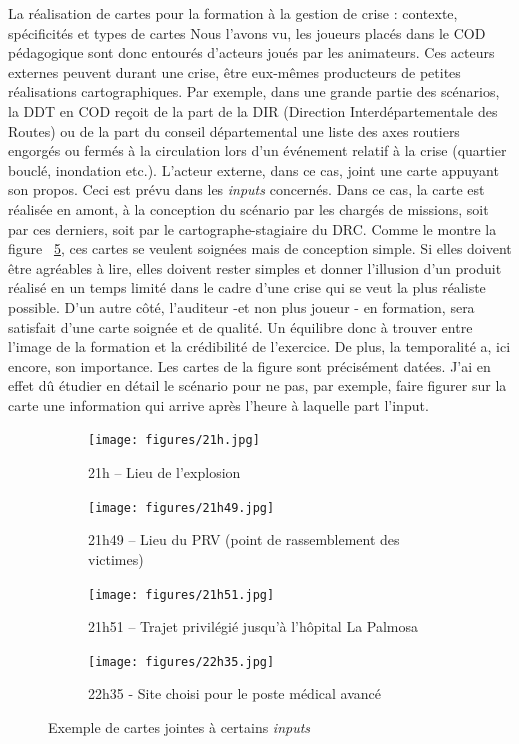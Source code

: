 \documentclass[10pt,a4paper]{report} %
\begin{document}
\begin{part}{La réalisation de cartes pour la formation à la gestion de crise : contexte, spécificités et types de cartes}
Nous l’avons vu, les joueurs placés dans le COD pédagogique sont donc entourés d’acteurs joués par les animateurs. Ces acteurs externes peuvent durant une crise, être eux-mêmes producteurs de petites réalisations cartographiques. Par exemple, dans une grande partie des scénarios, la DDT en COD reçoit de la part de la DIR (Direction Interdépartementale des Routes) ou de la part du conseil départemental une liste des axes routiers engorgés ou fermés à la circulation lors d’un événement relatif à la crise (quartier bouclé, inondation etc.). L’acteur externe, dans ce cas, joint une carte appuyant son propos. Ceci est prévu dans les \textit{inputs} concernés. Dans ce cas, la carte est réalisée en amont, à la conception du scénario par les chargés de missions, soit par ces derniers, soit par le cartographe-stagiaire du DRC. Comme le montre la figure ~\ref{fig:fig}, ces cartes se veulent soignées mais de conception simple. Si elles doivent être agréables à lire, elles doivent rester simples et donner l’illusion d’un produit réalisé en un temps limité dans le cadre d’une crise qui se veut la plus réaliste possible. D’un autre côté, l’auditeur -et non plus joueur - en formation, sera satisfait d’une carte soignée et de qualité. Un équilibre donc à trouver entre l’image de la formation et la crédibilité de l’exercice. De plus, la temporalité a, ici encore, son importance. Les cartes de la figure sont précisément datées. J’ai en effet dû étudier en détail le scénario pour ne pas, par exemple, faire figurer sur la carte une information qui arrive après l’heure à laquelle part l’input.
\begin{figure}
    \begin{subfigure}{.5\textwidth}
      \centering
      \texttt{[image: figures/21h.jpg]}
      \caption{21h – Lieu de l’explosion }
      \label{fig:sfig1}
    \end{subfigure}%
    \begin{subfigure}{.5\textwidth}
      \centering
      \texttt{[image: figures/21h49.jpg]}
      \caption{21h49 – Lieu du PRV (point de rassemblement des victimes) }
      \label{fig:sfig2}
    \end{subfigure}

    \begin{subfigure}{.5\textwidth}
        \centering
        \texttt{[image: figures/21h51.jpg]}
        \caption{21h51 – Trajet privilégié jusqu’à l’hôpital La Palmosa}
        \label{fig:sfig3}
      \end{subfigure}%
      \begin{subfigure}{.5\textwidth}
        \centering
        \texttt{[image: figures/22h35.jpg]}
        \caption{22h35 - Site choisi pour le poste médical avancé}
        \label{fig:sfig4}
      \end{subfigure}
    \caption{Exemple de cartes jointes à certains \textit{inputs}}
    \label{fig:fig}
    \end{figure}



\end{part}
\end{document}
